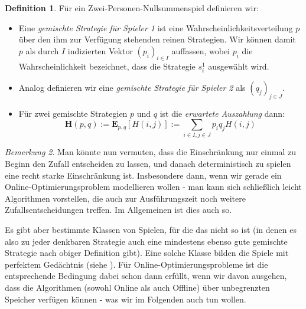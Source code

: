 \documentclass[a4paper,ngerman,12pt,bibtotoc]{scrartcl}
\theoremstyle{definition}
\newtheorem{defn}{Definition}[section]
\theoremstyle{plain}
\theoremstyle{remark}
\newtheorem{bem}[defn]{Bemerkung}
\renewcommand{\_}{\mathpunct{.}\,}
\newcommand{\?}{\,{:}\,}
\newcommand{\EE}{\mathbf{E}}
\newcommand{\Hf}{H}
\newcommand{\EH}{\boldsymbol{H}}
\newcommand{\ZPNS}{Zwei-Personen-Nullsummenspiel }
\begin{document}
	\begin{defn}Für ein \ZPNS definieren wir:	
		\begin{itemize}
			\item Eine \emph{gemischte Strategie für Spieler 1} ist eine Wahrscheinlichkeitsverteilung $p$ über den ihm zur Verfügung stehenden reinen Strategien. Wir können damit $p$ als durch $I$ indizierten Vektor $(p_i)_{i\in I}$ auffassen, wobei $p_i$ die Wahrscheinlichkeit bezeichnet, dass die Strategie $s_i^1$ ausgewählt wird.
			\item Analog definieren wir eine \emph{gemischte Strategie für Spieler 2} als $(q_j)_{j\in J}$.
			\item Für zwei gemischte Strategien $p$ und $q$ ist die \emph{erwartete Auszahlung} dann:
			\[\EH(p,q) := \EE_{p,q}\left[\Hf(i,j)\right] := \sum_{i\in I, j\in J} p_i q_j \Hf(i,j)\]
		\end{itemize}
	\end{defn}
	
	\begin{bem}\label{bem:SpielAeq}
		Man könnte nun vermuten, dass die Einschränkung nur einmal zu Beginn den Zufall entscheiden zu lassen, und danach deterministisch zu spielen eine recht starke Einschränkung ist. Insbesondere dann, wenn wir gerade ein Online-Optimierungsproblem modellieren wollen - man kann sich schließlich leicht Algorithmen vorstellen, die auch zur Ausführungszeit noch weitere Zufallsentscheidungen treffen. Im Allgemeinen ist dies auch so.
		
		Es gibt aber bestimmte Klassen von Spielen, für die das nicht so ist (in denen es also zu jeder denkbaren Strategie auch eine mindestens ebenso gute gemischte Strategie nach obiger Definition gibt). Eine solche Klasse bilden die Spiele mit perfektem Gedächtnis (siehe \cite[Theorem 6.3]{OCCA}). Für Online-Optimierungsprobleme ist die entsprechende Bedingung dabei schon dann erfüllt, wenn wir davon ausgehen, dass die Algorithmen (sowohl Online als auch Offline) über unbegrenzten Speicher verfügen können - was wir im Folgenden auch tun wollen.
	\end{bem}
	
\end{document}
